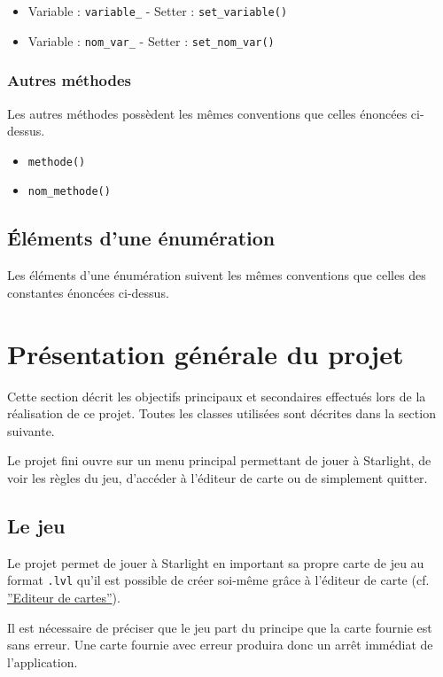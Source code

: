 \documentclass[]{article}
\begin{document}
\begin{itemize}
	\item Variable : \texttt{variable\_} - Setter : \texttt{set\_variable()}
	\item Variable : \texttt{nom\_var\_} - Setter : \texttt{set\_nom\_var()}
\end{itemize}

\subsubsection{Autres méthodes}

Les autres méthodes possèdent les mêmes conventions que celles
énoncées ci-dessus.

\begin{itemize}
	\item \texttt{methode()}
	\item \texttt{nom\_methode()}
\end{itemize}

\subsection{Éléments d'une énumération} 

Les éléments d'une énumération suivent les mêmes conventions que celles des constantes énoncées ci-dessus.

\newpage
\section{Présentation générale du projet}

Cette section décrit les objectifs principaux et secondaires effectués lors
de la réalisation de ce projet.
Toutes les classes utilisées sont décrites dans la section suivante.

Le projet fini ouvre sur un menu principal permettant
de jouer à Starlight, de voir les règles du jeu, d'accéder à l'éditeur de 
carte ou de simplement quitter.

\subsection{Le jeu}

Le projet permet de jouer à Starlight en important sa propre carte de jeu
au format \texttt{.lvl} qu'il est possible de créer soi-même grâce à l'éditeur
de carte (cf. \hyperref[Editeur]{''Editeur de cartes''}).

Il est nécessaire de préciser que le jeu part du principe que la carte 
fournie est sans erreur. Une carte fournie avec erreur produira donc
un arrêt immédiat de l'application.
\end{document}

